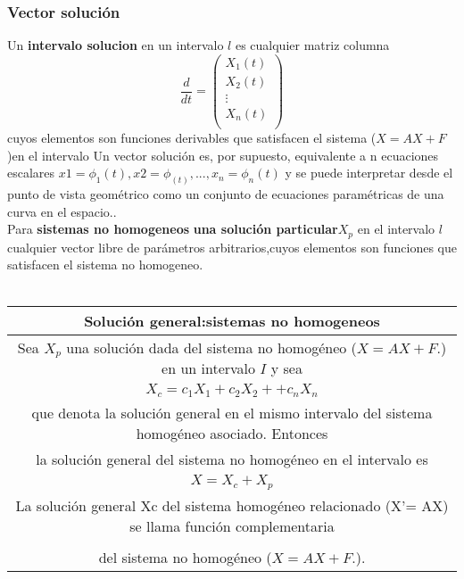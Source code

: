 \documentclass[11.5pt]{article}
\begin{document}
\subsubsection*{Vector solución}
Un \textbf{intervalo solucion} en un intervalo $l$ es cualquier matriz columna \\
\begin{equation}
\frac{d}{dt}=\begin{pmatrix}
 X_1(t)\\
 X_2(t)\\
 \vdots\\
 X_n(t)\\
\end{pmatrix}
\end{equation}
cuyos elementos son funciones derivables que satisfacen el sistema ($X =AX + F$)en el
intervalo Un vector solución  es, por supuesto, equivalente a n ecuaciones escalares 
$x1 =\phi_1(t),x2  =\phi_(t), . . . , x_n=\phi_n(t)$ y se puede interpretar desde el punto de vista geométrico como un conjunto de ecuaciones paramétricas de una curva en el espacio..\\

\vspace{0.6cm}
Para \textbf{sistemas no homogeneos} \textbf{una solución particular$ X_p$} en el intervalo $l$ cualquier vector libre de parámetros arbitrarios,cuyos elementos son funciones que satisfacen el sistema no homogeneo.\\
\vspace{0.6cm}\\
\begin{tabular}{|c|}
 \hline 
\textbf{Solución general:sistemas no homogeneos} \\ 
 \hline 
 Sea $X_p$ una solución dada del sistema no homogéneo ($X =AX + F.$) en un intervalo $I$ y sea\\ 
 $ X_{c}= c_{1}X_{1} +c_{2}X_{2}++c_{n}X_{n} $ \\ 
que denota la solución general en el mismo intervalo del sistema homogéneo asociado. Entonces \\
la solución general del sistema no homogéneo en el intervalo es \\ 
 $X =X_c+X _p $\\
 La solución general Xc del sistema homogéneo relacionado (X'= AX) se llama función complementaria \\
\\ del sistema no homogéneo ($X =AX + F.$).\\
 \hline 
 \end{tabular}  
 
\end{document}

